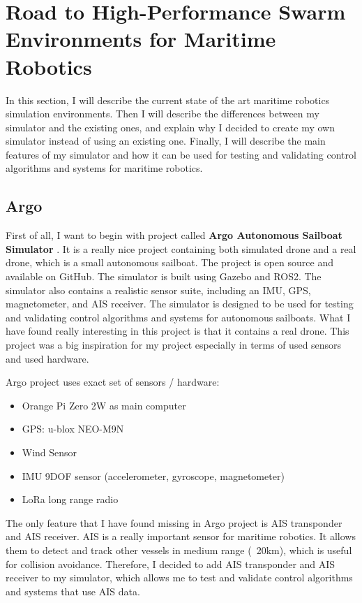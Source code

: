 \section{Road to High-Performance Swarm Environments for Maritime Robotics}

In this section, I will describe the current state of the art maritime robotics simulation environments. Then I will describe the differences between my simulator and the existing ones, and explain why I decided to create my own simulator instead of using an existing one. Finally, I will describe the main features of my simulator and how it can be used for testing and validating control algorithms and systems for maritime robotics.

\subsection{Argo}
First of all, I want to begin with project called \textbf{Argo Autonomous Sailboat
Simulator} \cite{Argo2024}. It is a really nice project containing both simulated drone and a real drone, which is a small autonomous sailboat. The project is open source and available on GitHub. The simulator is built using Gazebo and ROS2. The simulator also contains a realistic sensor suite, including an IMU, GPS, magnetometer, and AIS receiver. The simulator is designed to be used for testing and validating control algorithms and systems for autonomous sailboats. What I have found really interesting in this project is that it contains a real drone. This project was a big inspiration for my project especially in terms of used sensors and used hardware. 

\vspace{0.5cm}
Argo project uses exact set of sensors / hardware:
\begin{itemize}
    \item Orange Pi Zero 2W as main computer
    \item GPS: u-blox NEO-M9N
    \item Wind Sensor
    \item IMU 9DOF sensor (accelerometer, gyroscope, magnetometer)
    \item LoRa long range radio
\end{itemize}

The only feature that I have found missing in Argo project is AIS transponder and AIS receiver. AIS is a really important sensor for maritime robotics. It allows them to detect and track other vessels in medium range (~20km), which is useful for collision avoidance. Therefore, I decided to add AIS transponder and AIS receiver to my simulator, which allows me to test and validate control algorithms and systems that use AIS data.


